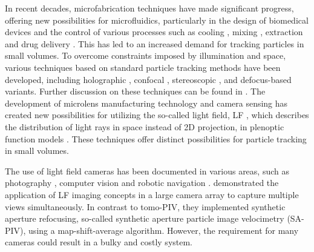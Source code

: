 \documentclass[draftthesis,fullpage]{uiucthesis}
\begin{document}
In recent decades, microfabrication techniques have made significant progress, offering new possibilities for microfluidics, particularly in the design of biomedical devices and the control of various processes such as cooling \citep{singhal2004microscale}, mixing  \citep{song2003millisecond,liu2004two}, extraction \citep{hisamoto2001chip, kluge2009production} and drug delivery \citep{tsai2007review, nguyen2013design}. This has led to an increased demand for tracking particles in small volumes. To overcome constraints imposed by illumination and space, various techniques based on standard particle tracking methods have been developed, including holographic \citep{sheng2006digital, soria2008towards, memmolo2011twin, daloglu2018label}, confocal \citep{kinoshita2007three, lima2008vitro}, stereoscopic \citep{lindken2006stereoscopic, bown2006three}, and defocus-based \citep{yoon20063d, pereira2007microscale} variants. Further discussion on these techniques can be found in \citet{wereley2010recent}. The development of microlens manufacturing technology and camera sensing has created new possibilities for utilizing the so-called light field, LF \citep{gershun1939light}, which describes the distribution of light rays in space instead of 2D projection, in plenoptic function models \citep{adelson1991plenoptic}. These techniques offer distinct possibilities for particle tracking in small volumes.  

The use of light field cameras has been documented in various areas, such as photography \citep{levoy1996light, ng2005fourier}, computer vision \citep{tao2013depth, adelson1992single} and robotic navigation \citep{kaveti2020light}. \citet{belden2010three} demonstrated the application of LF imaging concepts in a large camera array to capture multiple views simultaneously. In contrast to tomo-PIV, they implemented synthetic aperture refocusing, so-called synthetic aperture particle image velocimetry (SA-PIV), using a map-shift-average algorithm. However, the requirement for many cameras could result in a bulky and costly system.
\end{document}
